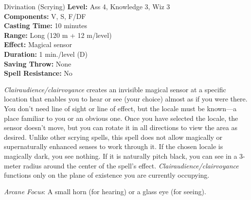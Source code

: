 {Divination (Scrying)}
{
	\textbf{Level:}
	Ass 4, Knowledge 3, Wiz 3\\
	\textbf{Components:}
	V, S, F/DF\\
	\textbf{Casting Time:}
	10 minutes\\
	\textbf{Range:}
	Long (120 m + 12 m/level)\\
	\textbf{Effect:}
	Magical sensor\\
	\textbf{Duration:}
	1 min./level (D)\\
	\textbf{Saving Throw:}
	None\\
	\textbf{Spell Resistance:}
	No\\
}
{
	\emph{Clairaudience/clairvoyance} creates an invisible magical sensor at a specific location that enables you to hear or see (your choice) almost as if you were there. You don't need line of sight or line of effect, but the locale must be known---a place familiar to you or an obvious one. Once you have selected the locale, the sensor doesn't move, but you can rotate it in all directions to view the area as desired. Unlike other scrying spells, this spell does not allow magically or supernaturally enhanced senses to work through it. If the chosen locale is magically dark, you see nothing. If it is naturally pitch black, you can see in a 3-meter radius around the center of the spell's effect. \emph{Clairaudience/clairvoyance} functions only on the plane of existence you are currently occupying.

	\textit{Arcane Focus}:
	A small horn (for hearing) or a glass eye (for seeing).

}
